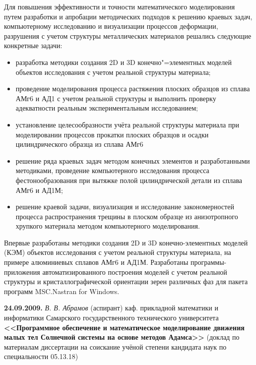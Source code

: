 {Для повышения эффективности и точности математического моделирования путем разработки и апробации методических подходов к решению краевых задач, компьютерному исследованию и визуализации процессов деформации, разрушения с учетом структуры металлических материалов
решались следующие конкретные задачи:
\begin{itemize}
\item[--] разработка методики создания 2D и 3D конечно"=элементных моделей объектов исследования с учетом реальной структуры материала;
\item[--] проведение моделирования процесса растяжения плоских образцов из сплава АМг6 и АД1 с учетом реальной структуры и выполнить проверку адекватности реальным экспериментальным исследованием;
\item[--]  установление целесообразности учёта реальной структуры материала при моделировании процессов прокатки плоских образцов и осадки цилиндрического образца из сплава АМг6
\item[--]  решение ряда краевых задач методом конечных элементов и разработанными методиками,  проведение компьютерного исследования процесса фестонообразования при вытяжке полой цилиндрической детали из сплава АМг6 и АД1М;
\item[--]  решение краевой задачи, визуализация и исследование закономерностей процесса распространения трещины в плоском образце из анизотропного хрупкого материала методом компьютерного моделирования.
\end{itemize}

Впервые разработаны методики создания 2D и 3D конечно-элементных моделей (КЭМ) объектов исследования с учетом реальной структуры материала, на примере алюминиевых сплавов АМг6 и АД1М. Разработаны программы-приложения автоматизированного построения моделей с учетом реальной структуры и кристаллографической ориентации зерен различных фаз для пакета программ MSC.Nastran for Windows.

}


\bigskip

\noindent
{\bf 24.09.2009.} {\it В. В. Абрамов} {\footnotesize (аспирант) каф. прикладной математики и информатики Самарского государственного технического университета} \\
{\bf <<Программное обеспечение и математическое моделирование движения малых тел Солнечной системы на основе методов Адамса>> } {\footnotesize (доклад по материалам диссертации на соискание учёной степени кандидата наук по специальности 05.13.18)}


